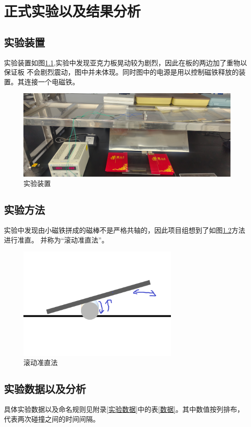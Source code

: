 \documentclass[AutoFakeBold]{LZUThesis}
\begin{document}
\chapter{正式实验以及结果分析}
\section{实验装置}
实验装置如图\ref{equ},实验中发现亚克力板晃动较为剧烈，因此在板的两边加了重物以保证板
不会剧烈震动，图中并未体现。同时图中的电源是用以控制磁铁释放的装置。其连接一个电磁铁。
\begin{figure}[H]
    \centering
    \includegraphics[width=12cm]{figures/eq.png}
    \caption{实验装置}
    \label{equ}
\end{figure}

\section{实验方法}
实验中发现由小磁铁拼成的磁棒不是严格共轴的，因此项目组想到了如图\ref{a_way}方法进行准直。
并称为“滚动准直法”。
\begin{figure}[H]
    \centering
    \includegraphics[width=8cm]{figures/a_way.png}
    \caption{滚动准直法}
    \label{a_way}
\end{figure}

\section{实验数据以及分析}
具体实验数据以及命名规则见附录\ref{实验数据}中的表\ref{数据}。其中数值按列排布，代表两次碰撞之间的时间间隔。
\end{document}
